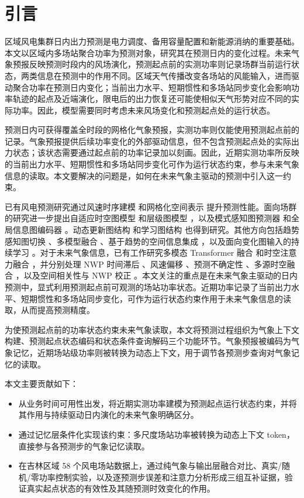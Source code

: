 \section{引言}

区域风电集群日内出力预测是电力调度、备用容量配置和新能源消纳的重要基础。本文以区域内多场站聚合功率为预测对象，研究其在预测日内的变化过程。未来气象预报反映预测时段内的风场演化，预测起点前的实测功率则记录场群当前运行状态，两类信息在预测中的作用不同。区域天气传播改变各场站的风能输入，进而驱动聚合功率在预测日内变化；当前出力水平、短期惯性和多场站同步变化会影响功率轨迹的起点及近端演化，限电后的出力恢复还可能使相似天气形势对应不同的实际功率。因此，模型需要同时考虑未来风场变化和预测起点处的运行状态。

预测日内可获得覆盖全时段的网格化气象预报，实测功率则仅能使用预测起点前的记录。气象预报提供后续功率变化的外部驱动信息，但不包含预测起点处的实际出力状态；该状态需要通过起点前的功率记录加以刻画。因此，近期实测功率所反映的当前出力水平、短期惯性和多场站同步变化可作为运行状态约束，参与未来气象信息的读取。本文要解决的问题是，如何在未来气象主驱动的预测中引入这一约束。

已有风电预测研究通过风速时序建模 \cite{ref1} 和网格化空间表示 \cite{ref2} 提升预测性能。面向场群的研究进一步提出自适应时空图模型 \cite{ref3} 和层级图模型 \cite{ref4}，以及模式感知图预测器 \cite{ref5} 和全局信息图编码器 \cite{ref6}。动态更新图结构 \cite{ref7} 和学习图结构 \cite{ref8} 也得到研究。其他方向包括趋势感知图切换 \cite{ref9}、多模型融合 \cite{ref10}、基于趋势的空间信息集成 \cite{ref11}，以及面向变化图输入的持续学习 \cite{ref12}。对于未来气象信息，已有工作研究多模态 Transformer 融合 \cite{ref13} 和时空注意力融合 \cite{ref14}，并分别处理 NWP 时间滞后 \cite{ref15}、风速偏移 \cite{ref16}、预测不确定性 \cite{ref_liu_bayesian_uncertainty}、多源时空融合 \cite{ref17}，以及空间相关性与 NWP 校正 \cite{ref18}。本文关注的重点是在未来气象主驱动的日内预测中，显式利用预测起点前可观测的场站功率状态。近期功率记录了当前出力水平、短期惯性和多场站同步变化，可作为运行状态约束作用于未来气象信息的读取，从而提高预测精度。

为使预测起点前的功率状态约束未来气象读取，本文将预测过程组织为气象上下文构建、预测起点状态编码和状态条件查询解码三个功能环节。气象预报被编码为气象记忆，近期场站级功率则被转换为动态上下文，用于调节各预测步查询对气象记忆的读取。

本文主要贡献如下：
\begin{itemize}
\item 从业务时间可用性出发，将近期实测功率建模为预测起点运行状态约束，并将其作用与持续驱动日内演化的未来气象明确区分。
\item 通过记忆层条件化实现该约束：多尺度场站功率被转换为动态上下文 token，直接参与各预测步的气象记忆读取。
\item 在吉林区域 58 个风电场站数据上，通过纯气象与输出层融合对比、真实/随机/零功率控制实验，以及逐预测步误差和注意力分析形成三组互补证据，验证真实起点状态的有效性及其随预测时效变化的作用。
\end{itemize}

